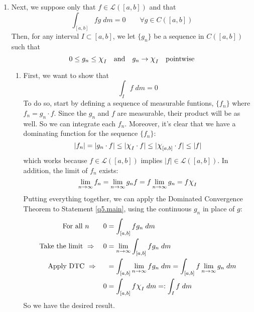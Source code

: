 \documentclass[12pt]{article}
\theoremstyle{plain}
\theoremstyle{definition}
\theoremstyle{remark}
\newcommand*{\Chi}{\mbox{\large$\chi$}} %
\begin{document}
\begin{enumerate}
\begin{enumerate}
\item Next, we suppose only that $f\in\mathscr{L}([a,b])$ and that 
\begin{equation}
    \label{q5.main}
    \int_{[a,b]} fg \; dm = 0 \qquad \forall 
    g\in C([a,b]) 
\end{equation}
Then, for any interval $I\subset[a,b]$, we let $\{g_n\}$ be a sequence in $C([a,b])$ such that 
\[
    0\leq g_n \leq \Chi_I 
    \quad \text{and} \quad
    g_n\rightarrow \Chi_I\quad\text{pointwise}
\]
\begin{enumerate} 
\item First, we want to show that 
\[
    \int_I f \; dm = 0
\]
To do so, start by defining a sequence of measurable funtions, $\{f_n\}$ where  $f_n= g_n \cdot f$. Since the $g_n$ and $f$ are measurable, their product will be as well. So we can integrate each $f_n$. Moreover, it's clear that we have a dominating function for the sequence $\{f_n\}$:
\[
    |f_n| = |g_n\cdot f| 
    \leq |\Chi_I\cdot f| 
    \leq |\Chi_{[a,b]}\cdot f| 
    \leq |f|
\]
which works because $f\in\mathscr{L}([a,b])$ implies $|f|\in\mathscr{L}([a,b])$. In addition, the limit of $f_n$ exists:
\[
    \lim_{n\rightarrow\infty} f_n = 
    \lim_{n\rightarrow\infty} g_n f = 
    f \lim_{n\rightarrow\infty} g_n = 
    f\Chi_I
\]
Putting everything together, we can apply the Dominated Convergence Theorem to Statement \ref{q5.main}, using the continuous $g_n$ in place of $g$:
\begin{align*}
    \text{For all $n$} \qquad 0 &= 
    \int_{[a,b]} fg_n \; dm   \\
    \text{Take the limit } \Rightarrow \quad 0 &= 
    \lim_{n\rightarrow\infty}\int_{[a,b]} fg_n \; dm \\
    \text{Apply DTC } 
    \Rightarrow \quad \;\;
    &= \int_{[a,b]} \lim_{n\rightarrow\infty} fg_n \; dm 
    = \int_{[a,b]} f\lim_{n\rightarrow\infty} g_n \; dm \\
    0 &= \int_{[a,b]} f\Chi_I \; dm 
    =: \int_{I} f \; dm 
\end{align*}
So we have the desired result.


\end{enumerate}
\end{enumerate}
\end{enumerate}
\end{document}
